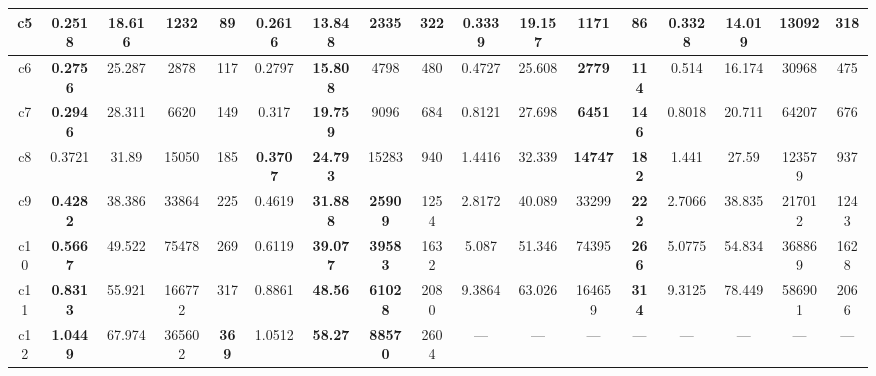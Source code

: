 \documentclass[landscape]{article}%
\begin{document}
\begin{tabular}{||c||c|c|c|c|c|c|c|c|c|c|c|c|c|c|c|c||}
\hline%
c5&\small{\textbf{0.2518}}&\small{18.616}&\small{1232}&\small{89}&\small{0.2616}&\small{\textbf{13.848}}&\small{2335}&\small{322}&\small{0.3339}&\small{19.157}&\small{\textbf{1171}}&\small{\textbf{86}}&\small{0.3328}&\small{14.019}&\small{13092}&\small{318}\\%
\hline%
c6&\small{\textbf{0.2756}}&\small{25.287}&\small{2878}&\small{117}&\small{0.2797}&\small{\textbf{15.808}}&\small{4798}&\small{480}&\small{0.4727}&\small{25.608}&\small{\textbf{2779}}&\small{\textbf{114}}&\small{0.514}&\small{16.174}&\small{30968}&\small{475}\\%
\hline%
c7&\small{\textbf{0.2946}}&\small{28.311}&\small{6620}&\small{149}&\small{0.317}&\small{\textbf{19.759}}&\small{9096}&\small{684}&\small{0.8121}&\small{27.698}&\small{\textbf{6451}}&\small{\textbf{146}}&\small{0.8018}&\small{20.711}&\small{64207}&\small{676}\\%
\hline%
c8&\small{0.3721}&\small{31.89}&\small{15050}&\small{185}&\small{\textbf{0.3707}}&\small{\textbf{24.793}}&\small{15283}&\small{940}&\small{1.4416}&\small{32.339}&\small{\textbf{14747}}&\small{\textbf{182}}&\small{1.441}&\small{27.59}&\small{123579}&\small{937}\\%
\hline%
c9&\small{\textbf{0.4282}}&\small{38.386}&\small{33864}&\small{225}&\small{0.4619}&\small{\textbf{31.888}}&\small{\textbf{25909}}&\small{1254}&\small{2.8172}&\small{40.089}&\small{33299}&\small{\textbf{222}}&\small{2.7066}&\small{38.835}&\small{217012}&\small{1243}\\%
\hline%
c10&\small{\textbf{0.5667}}&\small{49.522}&\small{75478}&\small{269}&\small{0.6119}&\small{\textbf{39.077}}&\small{\textbf{39583}}&\small{1632}&\small{5.087}&\small{51.346}&\small{74395}&\small{\textbf{266}}&\small{5.0775}&\small{54.834}&\small{368869}&\small{1628}\\%
\hline%
c11&\small{\textbf{0.8313}}&\small{55.921}&\small{166772}&\small{317}&\small{0.8861}&\small{\textbf{48.56}}&\small{\textbf{61028}}&\small{2080}&\small{9.3864}&\small{63.026}&\small{164659}&\small{\textbf{314}}&\small{9.3125}&\small{78.449}&\small{586901}&\small{2066}\\%
\hline%
c12&\small{\textbf{1.0449}}&\small{67.974}&\small{365602}&\small{\textbf{369}}&\small{1.0512}&\small{\textbf{58.27}}&\small{\textbf{88570}}&\small{2604}&\small{---}&\small{---}&\small{---}&\small{---}&\small{---}&\small{---}&\small{---}&\small{---}\\%
\hline%
\end{tabular}%
\end{document}
